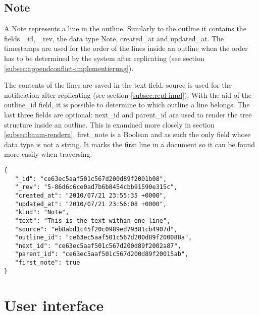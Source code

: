 \subsection{Note}

A {\selectfont Note} represents a line in the outline. Similarly to the outline it contains the fields {\selectfont\_id}, {\selectfont\_rev}, the data type {\selectfont Note}, {\selectfont created\_at} and {\selectfont updated\_at}. The timestamps are used for the order of the lines inside an outline when the order has to be determined by the system after replicating (see section \ref{subsec:appendconflict-implementierung}). 

The contents of the lines are saved in the {\selectfont text} field. {\selectfont source} is used for the notification after replicating (see section \ref{subsec:repl-impl}). With the aid of the {\selectfont outline\_id} field, it is possible to determine to which outline a line belongs. The last three fields are optional: {\selectfont next\_id} and {\selectfont parent\_id} are used to render the tree structure inside an outline. This is examined more closely in section \ref{subsec:baum-rendern}. {\selectfont first\_note} is a Boolean and as such the only field whose data type is not a string. It marks the first line in a document so it can be found more easily when traversing.

\medskip 
\begin{lstlisting}[label=code:note-example, caption=A Note document]
{
   "_id": "ce63ec5aaf501c567d200d89f2001b08",
   "_rev": "5-86d6c6ce0ad7b6b8454cbb91590e315c",
   "created_at": "2010/07/21 23:55:35 +0000",
   "updated_at": "2010/07/21 23:56:08 +0000",
   "kind": "Note",
   "text": "This is the text within one line",
   "source": "eb8abd1c45f20c0989ed79381cb4907d",
   "outline_id": "ce63ec5aaf501c567d200d89f200088a",
   "next_id": "ce63ec5aaf501c567d200d89f2002a87",
   "parent_id": "ce63ec5aaf501c567d200d89f20015ab",
   "first_note": true
}
\end{lstlisting}





\section{User interface}

